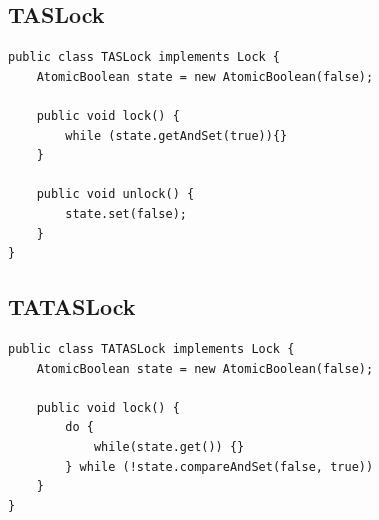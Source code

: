 \documentclass{article}
\begin{document}
\subsection{TASLock}
\begin{lstlisting}[style=java]
public class TASLock implements Lock {
    AtomicBoolean state = new AtomicBoolean(false);

    public void lock() {
        while (state.getAndSet(true)){}
    }

    public void unlock() {
        state.set(false);
    }
}
\end{lstlisting}

\subsection{TATASLock}
\begin{lstlisting}[style=java]
public class TATASLock implements Lock {
    AtomicBoolean state = new AtomicBoolean(false);

    public void lock() {
        do {
            while(state.get()) {}
        } while (!state.compareAndSet(false, true))
    }
}
\end{lstlisting}
\end{document}
